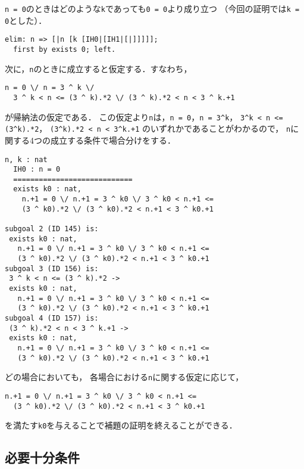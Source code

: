 {\tt{n = 0}}のときはどのような{\tt{k}}であっても{\tt{0 = 0}}より成り立つ
（今回の証明では{\tt{k = 0}}とした）．
\begin{lstlisting}[language=Coq]
  elim: n => [|n [k [IH0|[IH1|[|]]]]];
  first by exists 0; left.
\end{lstlisting}
次に，{\tt{n}}のときに成立すると仮定する．すなわち，
\begin{lstlisting}[language=Coq]
  n = 0 \/ n = 3 ^ k \/
  3 ^ k < n <= (3 ^ k).*2 \/ (3 ^ k).*2 < n < 3 ^ k.+1
\end{lstlisting}
が帰納法の仮定である．
この仮定より{\tt{n}}は，{\tt{n = 0}}，{\tt{n = 3\verb|^|k}}，
{\tt{3\verb|^|k < n <= (3\verb|^|k).*2}}，
{\tt{(3\verb|^|k).*2 < n < 3\verb|^|k.+1}}
のいずれかであることがわかるので，
{\tt{n}}に関する4つの成立する条件で場合分けをする．
\begin{lstlisting}[language=Coq]
    n, k : nat
  IH0 : n = 0
  ============================
  exists k0 : nat,
    n.+1 = 0 \/ n.+1 = 3 ^ k0 \/ 3 ^ k0 < n.+1 <=
    (3 ^ k0).*2 \/ (3 ^ k0).*2 < n.+1 < 3 ^ k0.+1

subgoal 2 (ID 145) is:
 exists k0 : nat,
   n.+1 = 0 \/ n.+1 = 3 ^ k0 \/ 3 ^ k0 < n.+1 <=
   (3 ^ k0).*2 \/ (3 ^ k0).*2 < n.+1 < 3 ^ k0.+1
subgoal 3 (ID 156) is:
 3 ^ k < n <= (3 ^ k).*2 ->
 exists k0 : nat,
   n.+1 = 0 \/ n.+1 = 3 ^ k0 \/ 3 ^ k0 < n.+1 <=
   (3 ^ k0).*2 \/ (3 ^ k0).*2 < n.+1 < 3 ^ k0.+1
subgoal 4 (ID 157) is:
 (3 ^ k).*2 < n < 3 ^ k.+1 ->
 exists k0 : nat,
   n.+1 = 0 \/ n.+1 = 3 ^ k0 \/ 3 ^ k0 < n.+1 <=
   (3 ^ k0).*2 \/ (3 ^ k0).*2 < n.+1 < 3 ^ k0.+1
\end{lstlisting}
どの場合においても，
各場合における{\tt{n}}に関する仮定に応じて，
\begin{lstlisting}[language=Coq]
  n.+1 = 0 \/ n.+1 = 3 ^ k0 \/ 3 ^ k0 < n.+1 <=
  (3 ^ k0).*2 \/ (3 ^ k0).*2 < n.+1 < 3 ^ k0.+1
\end{lstlisting}
を満たす{\tt{k0}}を与えることで補題の証明を終えることができる．

\subsection{必要十分条件}















